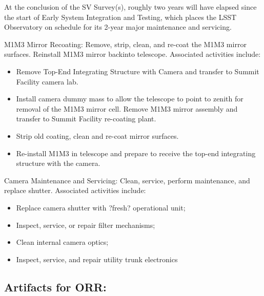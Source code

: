 At the conclusion of the SV Survey(s), roughly two years will have elapsed since the start of Early System Integration and Testing, which places the LSST Observatory on schedule for its 2-year major maintenance and servicing.

M1M3 Mirror Recoating: Remove, strip, clean, and re-coat the M1M3 mirror surfaces. Reinstall M1M3 mirror backinto telescope. Associated activities include:

\begin{itemize}
\item Remove Top-End Integrating Structure with Camera and transfer to Summit Facility camera lab.
\item Install camera dummy mass to allow the telescope to point to zenith for removal of the M1M3 mirror cell. Remove M1M3 mirror assembly and transfer to Summit Facility re-coating plant.
\item Strip old coating, clean and re-coat mirror surfaces.
\item Re-install M1M3 in telescope and prepare to receive the top-end integrating structure with the camera.
\end{itemize}

Camera Maintenance and Servicing: Clean, service, perform maintenance, and replace shutter. Associated activities include:

\begin{itemize}
\item Replace camera shutter with ?fresh? operational unit;
\item Inspect, service, or repair filter mechanisms;
\item Clean internal camera optics;
\item Inspect, service, and repair utility trunk electronics
\end{itemize}

\subsection{Artifacts for ORR:}

